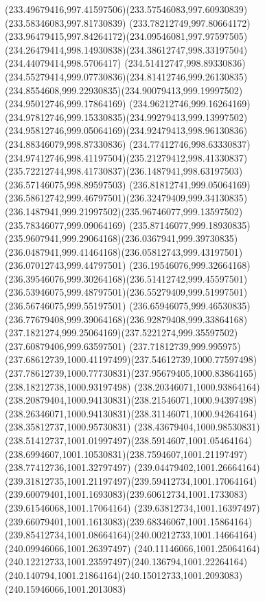 {{		\curveto(233.49679416,997.41597506)(233.57546083,997.60930839)(233.58346083,997.81730839)
		\curveto(233.78212749,997.80664172)(233.96479415,997.84264172)(234.09546081,997.97597505)
		\curveto(234.26479414,998.14930838)(234.38612747,998.33197504)(234.44079414,998.5706417)
		\curveto(234.51412747,998.89330836)(234.55279414,999.07730836)(234.81412746,999.26130835)
		\curveto(234.8554608,999.22930835)(234.90079413,999.19997502)(234.95012746,999.17864169)
		\curveto(234.96212746,999.16264169)(234.97812746,999.15330835)(234.99279413,999.13997502)
		\curveto(234.95812746,999.05064169)(234.92479413,998.96130836)(234.88346079,998.87330836)
		\curveto(234.77412746,998.63330837)(234.97412746,998.41197504)(235.21279412,998.41330837)
		\curveto(235.72212744,998.41730837)(236.1487941,998.63197503)(236.57146075,998.89597503)
		\curveto(236.81812741,999.05064169)(236.58612742,999.46797501)(236.32479409,999.34130835)
		\curveto(236.1487941,999.21997502)(235.96746077,999.13597502)(235.78346077,999.09064169)
		\curveto(235.87146077,999.18930835)(235.9607941,999.29064168)(236.0367941,999.39730835)
		\curveto(236.0487941,999.41464168)(236.05812743,999.43197501)(236.07012743,999.44797501)
		\curveto(236.19546076,999.32664168)(236.39546076,999.30264168)(236.51412742,999.45597501)
		\curveto(236.53946075,999.48797501)(236.55279409,999.51997501)(236.56746075,999.55197501)
		\curveto(236.65946075,999.46530835)(236.77679408,999.39064168)(236.92879408,999.33864168)
		\curveto(237.1821274,999.25064169)(237.5221274,999.35597502)(237.60879406,999.63597501)
		\curveto(237.71812739,999.995975)(237.68612739,1000.41197499)(237.54612739,1000.77597498)
		\curveto(237.78612739,1000.77730831)(237.95679405,1000.83864165)(238.18212738,1000.93197498)
		\curveto(238.20346071,1000.93864164)(238.20879404,1000.94130831)(238.21546071,1000.94397498)
		\curveto(238.26346071,1000.94130831)(238.31146071,1000.94264164)(238.35812737,1000.95730831)
		\curveto(238.43679404,1000.98530831)(238.51412737,1001.01997497)(238.5914607,1001.05464164)
		\curveto(238.6994607,1001.10530831)(238.7594607,1001.21197497)(238.77412736,1001.32797497)
		\curveto(239.04479402,1001.26664164)(239.31812735,1001.21197497)(239.59412734,1001.17064164)
		\curveto(239.60079401,1001.1693083)(239.60612734,1001.1733083)(239.61546068,1001.17064164)
		\curveto(239.63812734,1001.16397497)(239.66079401,1001.1613083)(239.68346067,1001.15864164)
		\curveto(239.85412734,1001.08664164)(240.00212733,1001.14664164)(240.09946066,1001.26397497)
		\curveto(240.11146066,1001.25064164)(240.12212733,1001.23597497)(240.136794,1001.22264164)
		\curveto(240.140794,1001.21864164)(240.15012733,1001.2093083)(240.15946066,1001.2013083)
}}
